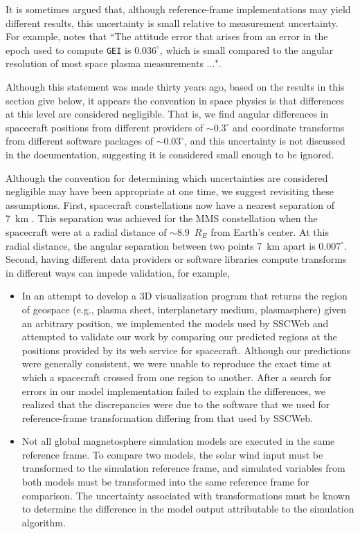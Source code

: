 \documentclass[draft]{agujournal2019}
\begin{document}

It is sometimes argued that, although reference-frame implementations may yield different results, this uncertainty is small relative to measurement uncertainty. For example,  notes that ``The attitude error that arises from an error in the epoch used to compute \texttt{GEI} is $0.036^\circ$, which is small compared to the angular resolution of most space plasma measurements ...". 

Although this statement was made thirty years ago, based on the results in this section give below, it appears the convention in space physics is that differences at this level are considered negligible. That is, we find angular differences in spacecraft positions from different providers of ${\sim}0.3^\circ$ and coordinate transforms from different software packages of ${\sim 0.03}^\circ$, and this uncertainty is not discussed in the documentation, suggesting it is considered small enough to be ignored.

Although the convention for determining which uncertainties are considered negligible may have been appropriate at one time, we suggest revisiting these assumptions. First, spacecraft constellations now have a nearest separation of 7~km \cite{NASA2016}. This separation was achieved for the MMS constellation when the spacecraft were at a radial distance of ${\sim}8.9$~$R_E$ from Earth's center. At this radial distance, the angular separation between two points 7~km apart is $0.007^\circ$. Second, having different data providers or software libraries compute transforms in different ways can impede validation, for example, 

\begin{itemize}
\item In an attempt to develop a 3D visualization program that returns the region of geospace (e.g., plasma sheet, interplanetary medium, plasmasphere) given an arbitrary position, we implemented the models used by SSCWeb \cite{SSCWeb} and attempted to validate our work by comparing our predicted regions at the positions provided by its web service for spacecraft. Although our predictions were generally consistent, we were unable to reproduce the exact time at which a spacecraft crossed from one region to another. After a search for errors in our model implementation failed to explain the differences, we realized that the discrepancies were due to the software that we used for reference-frame transformation differing from that used by SSCWeb.

\item Not all global magnetosphere simulation models are executed in the same reference frame. To compare two models, the solar wind input must be transformed to the simulation reference frame, and simulated variables from both models must be transformed into the same reference frame for comparison. The uncertainty associated with transformations must be known to determine the difference in the model output attributable to the simulation algorithm. 
\end{itemize}
\end{document}
